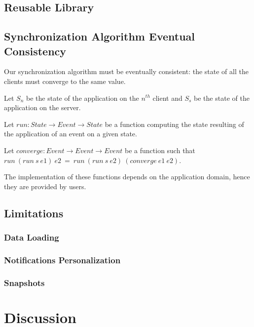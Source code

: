 \documentclass{acm_proc_article-sp}
\begin{document}
\subsection{Reusable Library}

\subsection{Synchronization Algorithm Eventual Consistency}

Our synchronization algorithm must be eventually consistent: the state of all the clients must converge to the same value.

Let $S_{n}$ be the state of the application on the $n^{th}$ client and $S_{s}$ be the state of the application on the server.

Let $run : State \rightarrow Event \rightarrow State$ be a function computing the state resulting of the application of an event on a given state.

Let $converge : Event \rightarrow Event \rightarrow Event$ be a function such that $run\:(run\:s\:e1)\:e2\:=\:run\:(run\:s\:e2)\:(converge\:e1\:e2)$.

The implementation of these functions depends on the application domain, hence they are provided by users.

\subsection{Limitations}

\subsubsection{Data Loading}

\subsubsection{Notifications Personalization}

\subsubsection{Snapshots}

\section{Discussion}

\balancecolumns
\end{document}
